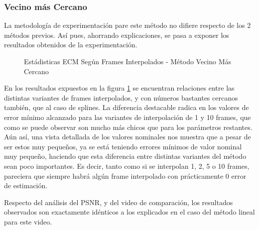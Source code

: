 \subsubsection{Vecino m\'as Cercano}
\par La metodolog\'ia de experimentaci\'on pare este m\'etodo no difiere
respecto de los 2 m\'etodos previos. As\'i pues, ahorrando explicaciones, se
pasa a exponer los resultados obtenidos de la experimentaci\'on.

\begin{figure}[H]
    \centering
    \caption{Est\'adisticas ECM Seg\'un Frames Interpolados - M\'etodo Vecino M\'as Cercano}
    \label{fig:fija-fija_vecino-mse_estadisticas}
\end{figure}

\par En los resultados expuestos en la figura \ref{fig:fija-fija_vecino-mse_estadisticas}
se encuentran relaciones entre las distintas variantes de frames interpolados, y
con n\'umeros bastantes cercanos tambi\'en, que al caso de splines. La diferencia
destacable radica en los valores de error m\'inimo alcanzado para las variantes de
interpolaci\'on de 1 y 10 frames, que como se puede observar son mucho m\'as chicos
que para los par\'ametros restantes. A\'un as\'i, una vista detallada de los valores nominales
nos muestra que a pesar de ser estos muy peque\~nos, ya se est\'a teniendo errores
m\'inimos de valor nominal muy peque\~no, haciendo que esta diferencia entre
distintas variantes del m\'etodo sean poco importantes. Es decir, tanto como si
se interpolan 1, 2, 5 o 10 frames, pareciera que siempre habr\'a alg\'un frame
interpolado con pr\'acticamente 0 error de estimaci\'on.

\par Respecto del an\'alisis del PSNR, y del video de comparaci\'on, los resultados
observados son exactamente id\'enticos a los explicados en el caso del m\'etodo
lineal para este video.

